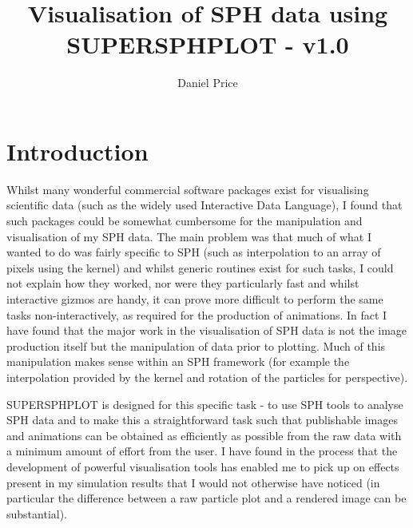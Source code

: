 \documentclass[a4paper,12pt]{article}
\title{Visualisation of SPH data using SUPERSPHPLOT - v1.0}
\author{Daniel Price}
\begin{document}
\maketitle
\tableofcontents

\newpage
\section{Introduction}
 Whilst many wonderful commercial software packages exist for visualising scientific
data (such as the widely used Interactive Data Language), I found that such packages
could be somewhat cumbersome for the manipulation and visualisation of my SPH data. The
main problem was that much of what I wanted to do was fairly specific to SPH (such as
interpolation to an array of pixels using the kernel) and whilst generic routines exist
for such tasks, I could not explain how they worked, nor were they
particularly fast and whilst interactive gizmos are handy, it can prove more difficult to perform the
same tasks non-interactively, as required for the production of animations. 
In fact I have found that the major
work in the visualisation of SPH data is not the image production itself but the
manipulation of data prior to plotting. Much of this manipulation makes sense
within an SPH framework (for example the interpolation provided by the kernel
and rotation of the particles for perspective).

 SUPERSPHPLOT is designed for this specific task - to use SPH tools to analyse SPH data and to make this a
straightforward task such that publishable images and animations can be obtained
as efficiently as possible from the raw data with a minimum amount of effort
from the user. I have found in the process that the development of powerful
visualisation tools has enabled me to pick up on effects present in my
simulation results that I would not otherwise have noticed (in particular the
difference between a raw particle plot and a rendered image can be substantial).
\end{document}
